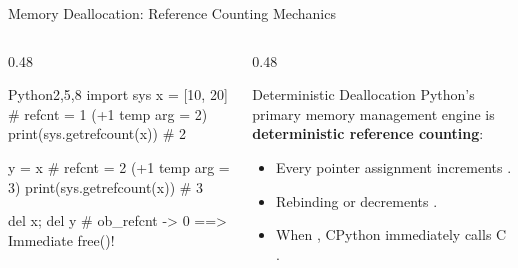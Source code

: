 \begin{frame}[fragile]{Memory Deallocation: Reference Counting Mechanics}
  \begin{columns}[T,onlytextwidth]
    \begin{column}{0.48\textwidth}
      \begin{HighlightedCodeBlock}{Python}{2,5,8}
import sys
x = [10, 20]
# refcnt = 1 (+1 temp arg = 2)
print(sys.getrefcount(x)) # 2

y = x
# refcnt = 2 (+1 temp arg = 3)
print(sys.getrefcount(x)) # 3

del x; del y
# ob_refcnt -> 0 ==> Immediate free()!
      \end{HighlightedCodeBlock}
    \end{column}
    \begin{column}{0.48\textwidth}
      \begin{ConceptBox}{Deterministic Deallocation}
        \scriptsize
        Python's primary memory management engine is \textbf{deterministic reference counting}:
        \begin{itemize}\setlength{\itemsep}{0.08cm}
          \item Every pointer assignment increments .
          \item Rebinding or  decrements .
          \item When , CPython immediately calls C .
        \end{itemize}
      \end{ConceptBox}
    \end{column}
  \end{columns}
  \vspace{0.15cm}
\end{frame}

